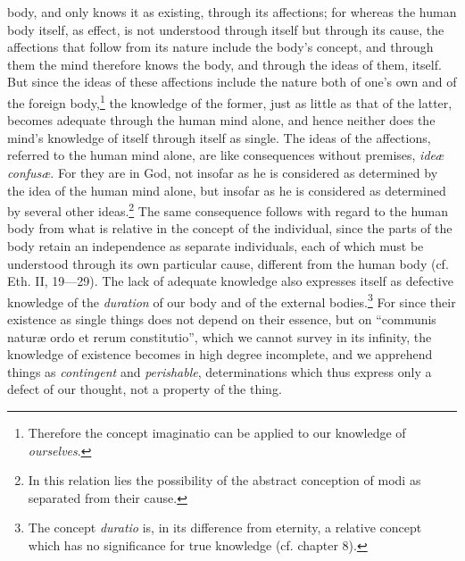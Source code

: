 \documentclass[12pt,a4paper,openany]{book}
\newcommand{\opage}[1]{\marginnote{\footnotesize\textit{[#1]}}}
\begin{document}
body, and only knows it as existing, through its
affections; for whereas the human body itself, as
effect, is not understood through itself but through its cause, the
affections that follow from its nature include the body's
concept, and through them the mind therefore knows the body, and
through the ideas of them, itself. But since the ideas of these affections
include the nature both of one's own and of the foreign body,\footnote{Therefore the concept imaginatio can be applied to
our knowledge of \emph{ourselves}.} the knowledge of the former,
just as little as that of the latter, becomes adequate through the human
\opage{90}\setcounter{footnote}{0}mind alone, and hence neither does the mind's
knowledge of itself through itself as single. The ideas of the affections,
referred to the human mind alone, are like
consequences without premises, \emph{ideæ confusæ}. For they are
in God, not insofar as he is considered as determined by
the idea of the human mind alone, but insofar as he is
considered as determined by several other ideas.\footnote{In this
relation lies the possibility of the abstract conception of modi
as separated from their cause.} The same consequence follows
with regard to the human body from what is relative in
the concept of the individual, since the parts of the body retain an
independence as separate individuals, each of which must
be understood through its own particular cause, different from the human body
(cf. Eth. II, 19---29). The lack of
adequate knowledge also expresses itself as defective
knowledge of the \emph{duration} of our body and of the external bodies.\footnote{The concept
\emph{duratio} is, in its difference from eternity, a relative concept
which has no significance for true knowledge (cf. chapter
8).} For since their existence as single things does not depend
on their essence, but on ``communis naturæ ordo et rerum
constitutio'', which we cannot survey in its
infinity, the knowledge of existence becomes in high degree
incomplete, and we apprehend things as \emph{contingent} and
\emph{perishable}, determinations which thus express only a
defect of our thought, not a property of the thing.
\end{document}
